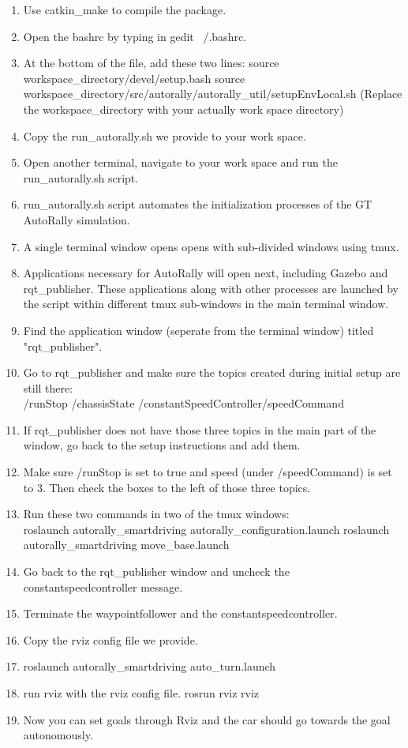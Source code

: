 \documentclass[compsoc,draftclsnofoot,onecolumn,10pt]{IEEEtran}
\begin{document}
\begin{enumerate}
	\item Use catkin\_make to compile the package.
	\item Open the bashrc by typing in gedit ~/.bashrc.
	\item At the bottom of the file, add these two lines: source workspace\_directory/devel/setup.bash source workspace\_directory/src/autorally/autorally\_util/setupEnvLocal.sh
	(Replace the workspace\_directory with your actually work space directory)
	\item Copy the run\_autorally.sh we provide to your work space.
	\item Open another terminal, navigate to your work space and run the run\_autorally.sh script.
	\item run\_autorally.sh script automates the initialization processes of the GT AutoRally simulation.
	\item A single terminal window opens opens with sub-divided windows using tmux.
	\item Applications necessary for AutoRally will open next, including Gazebo and rqt\_publisher. These applications along with other processes are launched by the script within different tmux sub-windows in the main terminal window.
	\item Find the application window (seperate from the terminal window) titled "rqt\_publisher".
	\item Go to rqt\_publisher and make sure the topics created during initial setup are still there:\\ /runStop /chassisState /constantSpeedController/speedCommand
	\item If rqt\_publisher does not have those three topics in the main part of the window, go back to the setup instructions and add them.
	\item Make sure /runStop is set to true and speed (under /speedCommand) is set to 3. Then check the boxes to the left of those three topics.
	\item Run these two commands in two of the tmux windows:\\ roslaunch autorally\_smartdriving autorally\_configuration.launch roslaunch autorally\_smartdriving move\_base.launch
	\item Go back to the rqt\_publisher window and uncheck the constantspeedcontroller message.
	\item Terminate the waypointfollower and the constantspeedcontroller.
	\item Copy the rviz config file we provide.
	\item roslaunch autorally\_smartdriving auto\_turn.launch
	\item run rviz with the rviz config file. rosrun rviz rviz
	\item Now you can set goals through Rviz and the car should go towards the goal autonomously.
\end{enumerate}
\end{document}
